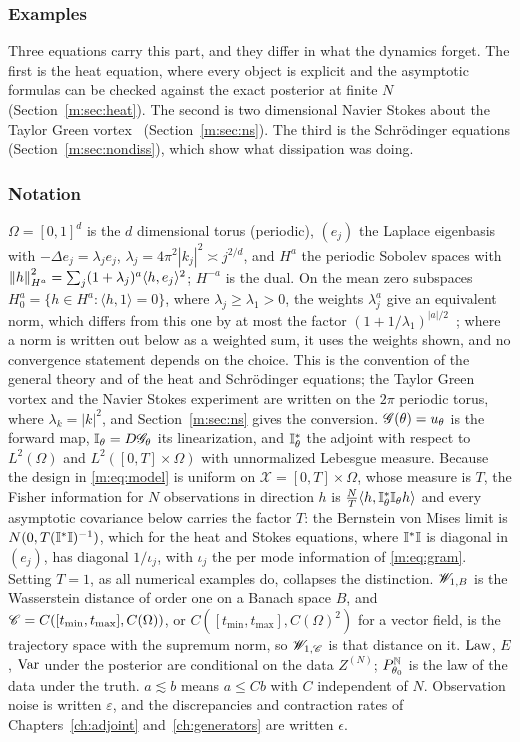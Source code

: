 \subsubsection{Examples} Three equations carry this part, and they differ in what the dynamics forget. The first is the heat equation, where every object is explicit and the asymptotic formulas can be checked against the exact posterior at finite $N$ (Section~\ref{m:sec:heat}). The second is two dimensional Navier Stokes about the Taylor Green vortex~\cite{taylorgreen1937} (Section~\ref{m:sec:ns}). The third is the Schr\"odinger equations (Section~\ref{m:sec:nondiss}), which show what dissipation was doing.

\subsubsection{Notation} $\Omega=[0,1]^d$ is the $d$ dimensional torus (periodic), $(e_j)$ the Laplace eigenbasis with $-\Delta e_j=\lambda_je_j$, $\lambda_j=4\pi^2|k_j|^2\asymp j^{2/d}$, and $H^a$ the periodic Sobolev spaces with $\left\|h\right\|_{H^a}^2=\sum_j(1+\lambda_j)^a\langle h,e_j\rangle^2$; $H^{-a}$ is the dual. On the mean zero subspaces $H^a_0=\{h\in H^a:\langle h,1\rangle=0\}$, where $\lambda_j\ge\lambda_1>0$, the weights $\lambda_j^a$ give an equivalent norm, which differs from this one by at most the factor $(1+1/\lambda_1)^{|a|/2}$~\cite{nicklbvm2024}; where a norm is written out below as a weighted sum, it uses the weights shown, and no convergence statement depends on the choice. This is the convention of the general theory and of the heat and Schr\"odinger equations; the Taylor Green vortex and the Navier Stokes experiment are written on the $2\pi$ periodic torus, where $\lambda_k=|k|^2$, and Section~\ref{m:sec:ns} gives the conversion. $\mathscr{G}(\theta)=u_\theta$ is the forward map, $\mathbb{I}_\theta=D\mathscr{G}_\theta$ its linearization, and $\mathbb{I}_\theta^*$ the adjoint with respect to $L^2(\Omega)$ and $L^2([0,T]\times\Omega)$ with unnormalized Lebesgue measure. Because the design in \eqref{m:eq:model} is uniform on $\mathcal X=[0,T]\times\Omega$, whose measure is $T$, the Fisher information for $N$ observations in direction $h$ is $\tfrac NT\langle h,\mathbb{I}^*_\theta\mathbb{I}_\theta h\rangle$ and every asymptotic covariance below carries the factor $T$: the Bernstein von Mises limit is $N(0,T(\mathbb{I}^*\mathbb{I})^{-1})$, which for the heat and Stokes equations, where $\mathbb{I}^*\mathbb{I}$ is diagonal in $(e_j)$, has diagonal $1/\iota_j$, with $\iota_j$ the per mode information of \eqref{m:eq:gram}. Setting $T=1$, as all numerical examples do, collapses the distinction. $\mathscr{W}_{1,B}$ is the Wasserstein distance of order one on a Banach space $B$, and $\mathscr{C}=C([t_{\min},t_{\max}],C(\Omega))$, or $C([t_{\min},t_{\max}],C(\Omega)^2)$ for a vector field, is the trajectory space with the supremum norm, so $\mathscr{W}_{1,\mathscr{C}}$ is that distance on it. $\operatorname{Law}$, $E$, $\mathrm{Var}$ under the posterior are conditional on the data $Z^{(N)}$; $P^{\mathbb{N}}_{\theta_0}$ is the law of the data under the truth. $a\lesssim b$ means $a\le Cb$ with $C$ independent of $N$. Observation noise is written $\varepsilon$, and the discrepancies and contraction rates of Chapters~\ref{ch:adjoint} and~\ref{ch:generators} are written $\epsilon$.

